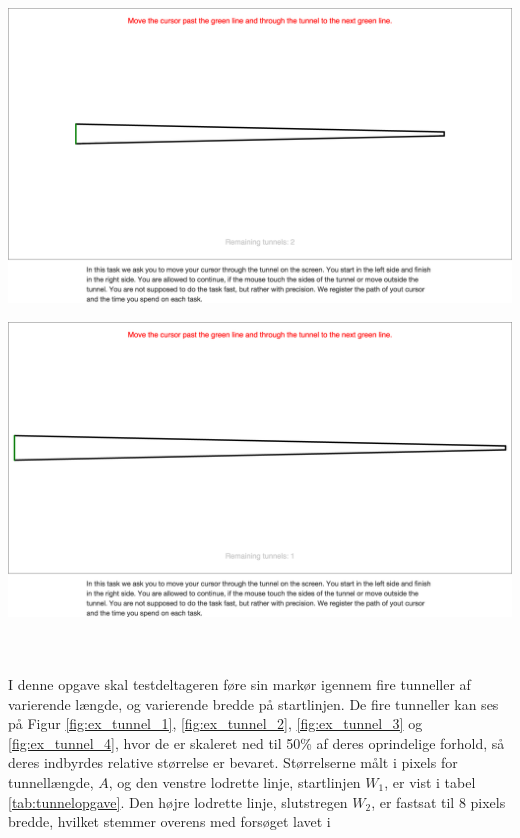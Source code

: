 \begin{minipage}{\linewidth}
\begin{minipage}{\textwidth}
		\label{fig:ex_tunnel_2}
	\end{minipage}
	\begin{minipage}{\textwidth}
		\centering
		\includegraphics[width=\textwidth, trim = .5cm 21cm .5cm 15cm, clip]{images/screenshots/ex_step_4_tunnel_3}
		\label{fig:ex_tunnel_3}
	\end{minipage}
	\begin{minipage}{\textwidth}
		\centering
		\includegraphics[width=\textwidth, trim = .5cm 20cm .5cm 15cm, clip]{images/screenshots/ex_step_4_tunnel_4}
		\label{fig:ex_tunnel_4}
	\end{minipage}
\end{minipage}\\\\
I denne opgave skal testdeltageren føre sin markør igennem fire tunneller af varierende længde, og varierende bredde på startlinjen. De fire tunneller kan ses på Figur \ref{fig:ex_tunnel_1}, \ref{fig:ex_tunnel_2}, \ref{fig:ex_tunnel_3} og \ref{fig:ex_tunnel_4}, hvor de er skaleret ned til 50\% af deres oprindelige forhold, så deres indbyrdes relative størrelse er bevaret.  Størrelserne målt i pixels for tunnellængde, $A$, og den venstre lodrette linje, startlinjen $W_1$, er vist i tabel \ref{tab:tunnelopgave}. Den højre lodrette linje, slutstregen $W_2$, er fastsat til 8 pixels bredde, hvilket stemmer overens med forsøget lavet i \cite{accot1997}
